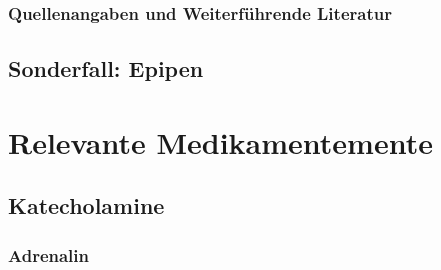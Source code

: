\subsubsection{{\protect\dsliterary} Quellenangaben und
Weiterführende Literatur}
\cite{GabkaInjektionstechnik,InjektionenLeichtGemacht4,LippertAnatomie7}


\subsection{Sonderfall: Epipen{\texttrademark}}


\section{Relevante Medikamentemente}


\subsection{Katecholamine}

\subsubsection{Adrenalin}

